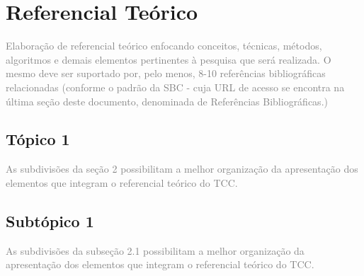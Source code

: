 \section{Referencial Teórico}
\textcolor{gray}{Elaboração de referencial teórico enfocando conceitos, técnicas, métodos, algoritmos e demais elementos pertinentes à pesquisa que será realizada. O mesmo deve ser suportado por, pelo menos, 8-10 referências bibliográficas relacionadas (conforme o padrão da SBC - cuja URL de acesso se encontra na última seção deste documento, denominada de Referências Bibliográficas.)}

\subsection{Tópico 1}
\textcolor{gray}{As subdivisões da seção 2 possibilitam a melhor organização da apresentação dos elementos que integram o referencial teórico do TCC.}

\subsection{Subtópico 1}

\textcolor{gray}{As subdivisões da subseção 2.1 possibilitam a melhor organização da apresentação dos elementos que integram o referencial teórico do TCC.}
